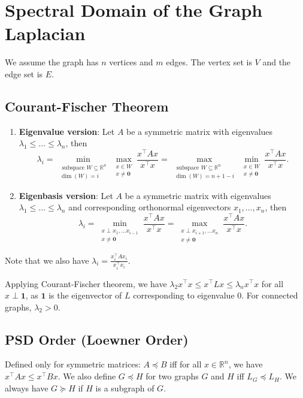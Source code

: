 \section{Spectral Domain of the Graph Laplacian}

We assume the graph has $n$ vertices and $m$ edges. The vertex set is $V$ and the edge set is $E$.

\subsection{Courant-Fischer Theorem}
\begin{enumerate}
    \item \textbf{Eigenvalue version}: Let $A$ be a symmetric matrix with eigenvalues $\lambda_1 \le \dots \le \lambda_n$, then 
    $$\lambda_{i}=\min _{\substack{\text { subspace } W \subseteq \mathbb{R}^{n} \\ \operatorname{dim}(W)=i}} \max _{\substack{x \in W \\ x \neq \mathbf{0}}} \frac{x^{\top} A x}{x^{\top} x} = \max _{\substack{\text { subspace } W \subseteq \mathbb{R}^{n} \\ \operatorname{dim}(W)=n+1-i}} \min _{\substack{x \in W\\ x \neq \mathbf{0}}} \frac{x^{\top} A x}{x^{\top} x}.$$
    \item \textbf{Eigenbasis version}: Let $A$ be a symmetric matrix with eigenvalues $\lambda_1 \le \dots \le \lambda_n$ and corresponding orthonormal eigenvectors $x_1, \dots, x_n$, then
    $$\lambda_{i}=\min _{\substack{x \perp x_{1}, \ldots x_{i-1} \\ x \neq \mathbf{0}}} \frac{x^{\top} A x}{x^{\top} x} = \max _{\substack{x \perp x_{i+1}, \ldots x_{n} \\ x \neq \mathbf{0}}} \frac{x^{\top} A x}{x^{\top} x}.$$
\end{enumerate}
Note that we also have $\lambda_i = \frac{x_i^\top A x_i}{x_i^\top x_i}$.

Applying Courant-Fischer theorem, we have $\lambda_2 x^\top x  \le x^\top L x \le \lambda_n x^\top x$ for all $x \perp \boldsymbol{1}$, as $\boldsymbol{1}$ is the eigenvector of $L$ corresponding to eigenvalue $0$. For connected graphs, $\lambda_2 > 0$.

\subsection{PSD Order (Loewner Order)}

Defined only for symmetric matrices: $A \preceq B$ iff for all $x \in \mathbb{R}^{n}$, we have $x^{\top} A x \leq x^{\top} B x$. We also define $G \preceq H$ for two graphs $G$ and $H$ iff $L_G \preceq L_H$. We always have $G \succeq H$ if $H$ is a subgraph of $G$.

